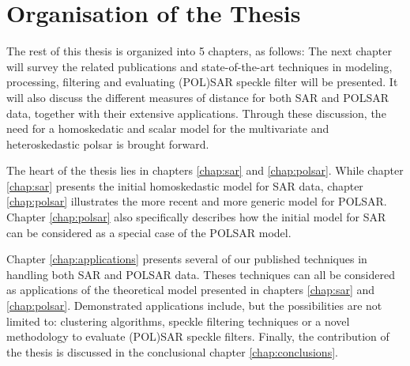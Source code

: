 	\section{Organisation of the Thesis}
The rest of this thesis is organized into 5 chapters, as follows:
The next chapter will survey the related publications
  and state-of-the-art techniques in modeling, processing, filtering and evaluating (POL)SAR speckle filter will be presented.
It will also discuss the different measures of distance for both SAR and POLSAR data, together with their extensive applications. 
Through these discussion, the need for a homoskedatic and scalar model for the multivariate and heteroskedastic polsar is brought forward.

The heart of the thesis lies in chapters \ref{chap:sar} and \ref{chap:polsar}.
While chapter \ref{chap:sar} presents the initial homoskedastic model for SAR data, 
chapter \ref{chap:polsar} illustrates the more recent and more generic model for POLSAR.
Chapter \ref{chap:polsar} also specifically describes how the initial model for SAR can be considered as a special case of the POLSAR model.

Chapter \ref{chap:applications} presents several of our published techniques in handling both SAR and POLSAR data.
Theses techniques can all be considered as applications of the theoretical model presented in chapters \ref{chap:sar} and \ref{chap:polsar}.
Demonstrated applications include, but the possibilities are not limited to: clustering algorithms, speckle filtering techniques or a novel methodology to evaluate (POL)SAR speckle filters.
Finally, the contribution of the thesis is discussed in the conclusional chapter \ref{chap:conclusions}.
